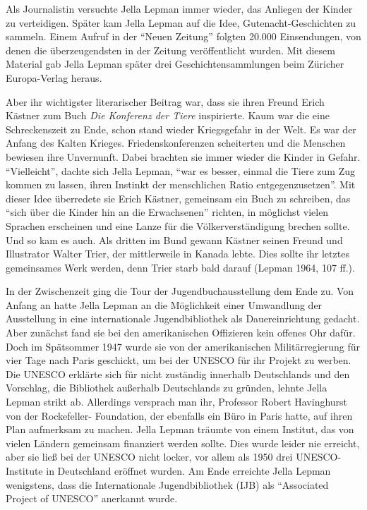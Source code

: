 \documentclass[a4paper,
fontsize=11pt,
oneside,
numbers=noperiodatend,
parskip=half-,
bibliography=totoc,
final
]{scrartcl}
\begin{document}
Als Journalistin versuchte Jella Lepman immer wieder, das Anliegen der
Kinder zu verteidigen. Später kam Jella Lepman auf die Idee,
Gutenacht-Geschichten zu sammeln. Einem Aufruf in der \enquote{Neuen
Zeitung} folgten 20.000 Einsendungen, von denen die überzeugendsten in
der Zeitung veröffentlicht wurden. Mit diesem Material gab Jella Lepman
später drei Geschichtensammlungen beim Züricher Europa-Verlag heraus.~

Aber ihr wichtigster literarischer Beitrag war, dass sie ihren Freund
Erich Kästner zum Buch \emph{Die Konferenz der Tiere} inspirierte. Kaum
war die eine Schreckenszeit zu Ende, schon stand wieder Kriegsgefahr in
der Welt. Es war der Anfang des Kalten Krieges. Friedenskonferenzen
scheiterten und die Menschen bewiesen ihre Unvernunft. Dabei brachten
sie immer wieder die Kinder in Gefahr. \enquote{Vielleicht}, dachte sich
Jella Lepman, \enquote{war es besser, einmal die Tiere zum Zug kommen zu
lassen, ihren Instinkt der menschlichen Ratio entgegenzusetzen}. Mit
dieser Idee überredete sie Erich Kästner, gemeinsam ein Buch zu
schreiben, das \enquote{sich über die Kinder hin an die Erwachsenen}
richten, in möglichst vielen Sprachen erscheinen und eine Lanze für die
Völkerverständigung brechen sollte. Und so kam es auch. Als dritten im
Bund gewann Kästner seinen Freund und Illustrator Walter Trier, der
mittlerweile in Kanada lebte. Dies sollte ihr letztes gemeinsames Werk
werden, denn Trier starb bald darauf (Lepman 1964, 107 ff.).

In der Zwischenzeit ging die Tour der Jugendbuchausstellung dem Ende zu.
Von Anfang an hatte Jella Lepman an die Möglichkeit einer Umwandlung der
Ausstellung in eine internationale Jugendbibliothek als Dauereinrichtung
gedacht. Aber zunächst fand sie bei den amerikanischen Offizieren kein
offenes Ohr dafür. Doch im Spätsommer 1947 wurde sie von der
amerikanischen Militärregierung für vier Tage nach Paris geschickt, um
bei der UNESCO für ihr Projekt zu werben. Die UNESCO erklärte sich für
nicht zuständig innerhalb Deutschlands und den Vorschlag, die Bibliothek
außerhalb Deutschlands zu gründen, lehnte Jella Lepman strikt ab.
Allerdings versprach man ihr, Professor Robert Havinghurst von der
Rockefeller- Foundation, der ebenfalls ein Büro in Paris hatte, auf
ihren Plan aufmerksam zu machen. Jella Lepman träumte von einem
Institut, das von vielen Ländern gemeinsam finanziert werden sollte.
Dies wurde leider nie erreicht, aber sie ließ bei der UNESCO nicht
locker, vor allem als 1950 drei UNESCO-Institute in Deutschland eröffnet
wurden. Am Ende erreichte Jella Lepman wenigstens, dass die
Internationale Jugendbibliothek (IJB) als \enquote{Associated Project of
UNESCO} anerkannt wurde.
\end{document}

